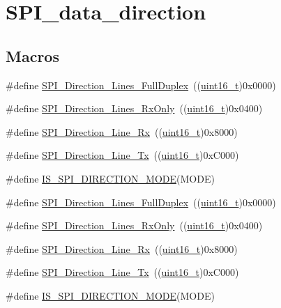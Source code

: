 \hypertarget{group___s_p_i__data__direction}{}\section{S\+P\+I\+\_\+data\+\_\+direction}
\label{group___s_p_i__data__direction}
\subsection*{Macros}
\begin{DoxyCompactItemize}
\item 
\#define \hyperlink{group___s_p_i__data__direction_gab6bdb82e315a90210c4425c46bbdf5f1}{S\+P\+I\+\_\+\+Direction\+\_\+Lines\+\_\+\+Full\+Duplex}~((\hyperlink{_p_e___types_8h_a1f1825b69244eb3ad2c7165ddc99c956}{uint16\+\_\+t})0x0000)
\item 
\#define \hyperlink{group___s_p_i__data__direction_gab8ab942f7240394f50e4c86c5288516a}{S\+P\+I\+\_\+\+Direction\+\_\+Lines\+\_\+\+Rx\+Only}~((\hyperlink{_p_e___types_8h_a1f1825b69244eb3ad2c7165ddc99c956}{uint16\+\_\+t})0x0400)
\item 
\#define \hyperlink{group___s_p_i__data__direction_ga42ea8306cfc1f23ffc51efae6f66320e}{S\+P\+I\+\_\+\+Direction\+\_\+Line\+\_\+\+Rx}~((\hyperlink{_p_e___types_8h_a1f1825b69244eb3ad2c7165ddc99c956}{uint16\+\_\+t})0x8000)
\item 
\#define \hyperlink{group___s_p_i__data__direction_ga70cc710a771065b2ed11c2ac9697defe}{S\+P\+I\+\_\+\+Direction\+\_\+Line\+\_\+\+Tx}~((\hyperlink{_p_e___types_8h_a1f1825b69244eb3ad2c7165ddc99c956}{uint16\+\_\+t})0x\+C000)
\item 
\#define \hyperlink{group___s_p_i__data__direction_ga536857c68ce1d9806c04046707448b3e}{I\+S\+\_\+\+S\+P\+I\+\_\+\+D\+I\+R\+E\+C\+T\+I\+O\+N\+\_\+\+M\+O\+DE}(M\+O\+DE)
\item 
\#define \hyperlink{group___s_p_i__data__direction_gab6bdb82e315a90210c4425c46bbdf5f1}{S\+P\+I\+\_\+\+Direction\+\_\+Lines\+\_\+\+Full\+Duplex}~((\hyperlink{_p_e___types_8h_a1f1825b69244eb3ad2c7165ddc99c956}{uint16\+\_\+t})0x0000)
\item 
\#define \hyperlink{group___s_p_i__data__direction_gab8ab942f7240394f50e4c86c5288516a}{S\+P\+I\+\_\+\+Direction\+\_\+Lines\+\_\+\+Rx\+Only}~((\hyperlink{_p_e___types_8h_a1f1825b69244eb3ad2c7165ddc99c956}{uint16\+\_\+t})0x0400)
\item 
\#define \hyperlink{group___s_p_i__data__direction_ga42ea8306cfc1f23ffc51efae6f66320e}{S\+P\+I\+\_\+\+Direction\+\_\+Line\+\_\+\+Rx}~((\hyperlink{_p_e___types_8h_a1f1825b69244eb3ad2c7165ddc99c956}{uint16\+\_\+t})0x8000)
\item 
\#define \hyperlink{group___s_p_i__data__direction_ga70cc710a771065b2ed11c2ac9697defe}{S\+P\+I\+\_\+\+Direction\+\_\+Line\+\_\+\+Tx}~((\hyperlink{_p_e___types_8h_a1f1825b69244eb3ad2c7165ddc99c956}{uint16\+\_\+t})0x\+C000)
\item 
\#define \hyperlink{group___s_p_i__data__direction_ga536857c68ce1d9806c04046707448b3e}{I\+S\+\_\+\+S\+P\+I\+\_\+\+D\+I\+R\+E\+C\+T\+I\+O\+N\+\_\+\+M\+O\+DE}(M\+O\+DE)
\end{DoxyCompactItemize}


